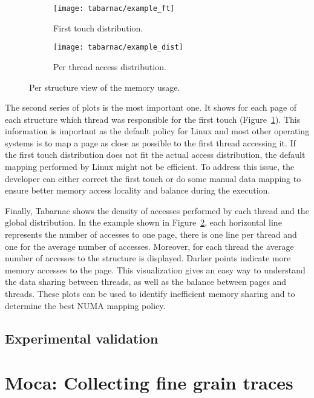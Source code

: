 \begin{figure}[htb]
    \centering
    \begin{subfigure}{.49\linewidth}
        \texttt{[image: tabarnac/example\_ft]}
        \caption{First touch distribution.}
        \label{fig:example_ft}
    \end{subfigure}
    \begin{subfigure}{.49\linewidth}
        \texttt{[image: tabarnac/example\_dist]}
        \caption{Per thread access distribution.}
        \label{fig:example_dist}
    \end{subfigure}
    \caption{Per structure view of the memory usage.}
    \label{fig:example_by_structs}
\end{figure}

The second series of plots is the most important one.
It shows for each page of each structure which thread was responsible for the first touch (Figure~\ref{fig:example_ft}).
This information is important as the default policy for \gls{Linux} and most other operating systems is to map a page as close as possible to the first thread accessing it.
If the first touch distribution does not fit the actual access distribution, the default mapping performed by \gls{Linux} might not be efficient.
To address this issue, the developer can either correct the first touch or do some manual data mapping to ensure better memory access locality and balance during the execution.

Finally, \gls{Tabarnac} shows the density of accesses performed by each thread and the global distribution.
In the example shown in Figure~\ref{fig:example_dist}, each horizontal line represents the number of accesses to one page, there is one line per thread and one for the average number of accesses.
Moreover, for each thread the average number of accesses to the structure is displayed.
Darker points indicate more memory accesses to the page. This visualization gives an easy way to understand the data sharing between threads, as well as the balance between pages and
threads.
These plots can be used to identify inefficient memory sharing and to determine the best \gls{NUMA} mapping policy.

\subsection{Experimental validation}



\section{Moca: Collecting fine grain traces}
\label{sec:Moca}

